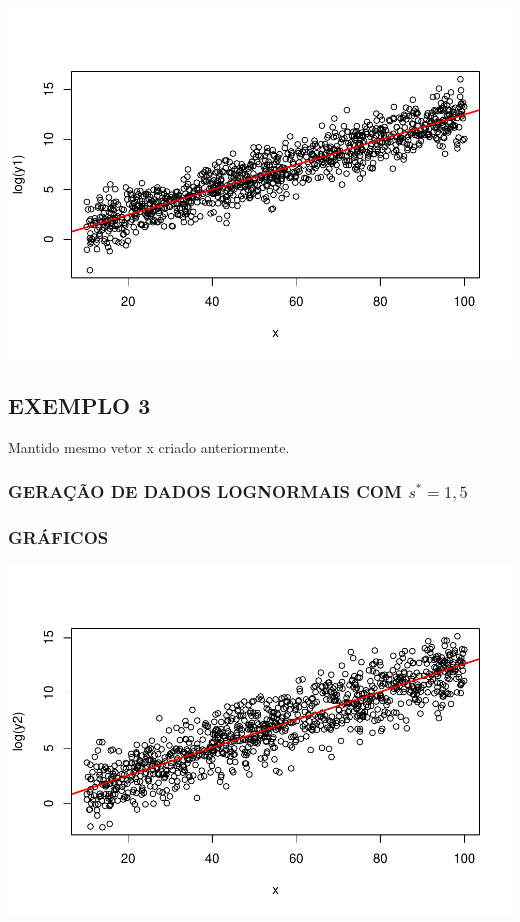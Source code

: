 \documentclass[]{article}
\begin{document}
\includegraphics{Impacto_sigma_files/figure-latex/unnamed-chunk-7-1.pdf}

\subsection{EXEMPLO 3}\label{exemplo-3}

Mantido mesmo vetor x criado anteriormente.

\subsubsection{\texorpdfstring{GERAÇÃO DE DADOS LOGNORMAIS COM
\(s^* = 1,5\)}{GERAÇÃO DE DADOS LOGNORMAIS COM s\^{}* = 1,5}}\label{geracao-de-dados-lognormais-com-s-15}

\subsubsection{GRÁFICOS}\label{graficos-2}

\includegraphics{Impacto_sigma_files/figure-latex/unnamed-chunk-10-1.pdf}
\end{document}
